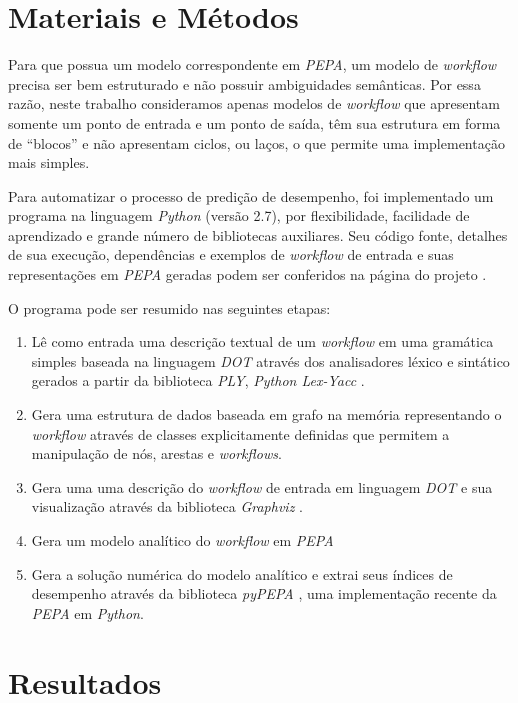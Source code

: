 \documentclass[a4paper,11pt]{article}
\begin{document}
    \section*{Materiais e Métodos}
        Para que possua um modelo correspondente em \emph{PEPA}, um modelo de \emph{workflow} precisa ser bem estruturado e não possuir ambiguidades semânticas. Por essa razão, neste trabalho consideramos apenas modelos de \emph{workflow} que apresentam somente um ponto de entrada e um ponto de saída, têm sua estrutura em forma de ``blocos''  e não apresentam ciclos, ou laços, o que permite uma implementação mais simples.

        Para automatizar o processo de predição de desempenho, foi implementado um programa na linguagem \emph{Python} (versão 2.7), por flexibilidade, facilidade de aprendizado e grande número de bibliotecas auxiliares. Seu código fonte, detalhes de sua execução, dependências e exemplos de \emph{workflow} de entrada e suas representações em \emph{PEPA} geradas podem ser conferidos na página do projeto \cite{web:script}.

        \newpage
        O programa pode ser resumido nas seguintes etapas:

        \begin{enumerate}
            \item Lê como entrada uma descrição textual de um \emph{workflow} em uma gramática simples baseada na linguagem \emph{DOT} \cite{web:dot} através dos analisadores léxico e sintático gerados a partir da biblioteca \emph{PLY}, \emph{Python Lex-Yacc} \cite{web:ply}.
            \item Gera uma estrutura de dados baseada em grafo na memória representando o \emph{workflow} através de classes explicitamente definidas que permitem a manipulação de nós, arestas e \emph{workflows}.
            \item Gera uma uma descrição do \emph{workflow} de entrada em linguagem \emph{DOT} e sua visualização através da biblioteca \emph{Graphviz} \cite{web:graphviz}.
            \item Gera um modelo analítico do \emph{workflow} em \emph{PEPA}
            \item Gera a solução numérica do modelo analítico e extrai seus índices de desempenho através da biblioteca \emph{pyPEPA} \cite{web:pypepa}, uma implementação recente da \emph{PEPA} em \emph{Python}.
        \end{enumerate}

    \section*{Resultados}
\end{document}
